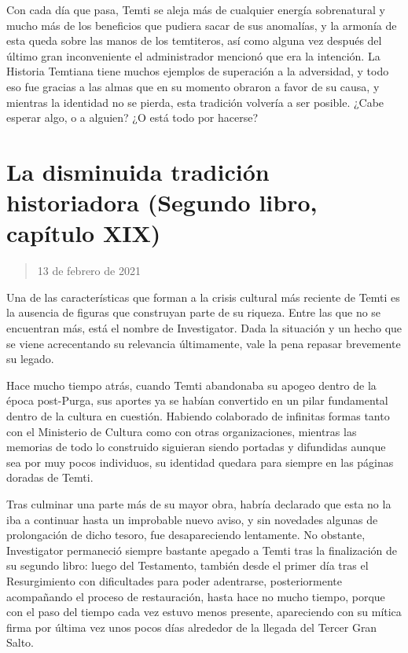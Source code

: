\documentclass[
  spanish,
]{book}
\begin{document}
Con cada día que pasa, Temti se aleja más de cualquier energía sobrenatural y mucho más de los beneficios que pudiera sacar de sus anomalías, y la armonía de esta queda sobre las manos de los temtiteros, así como alguna vez después del último gran inconveniente el administrador mencionó que era la intención. La Historia Temtiana tiene muchos ejemplos de superación a la adversidad, y todo eso fue gracias a las almas que en su momento obraron a favor de su causa, y mientras la identidad no se pierda, esta tradición volvería a ser posible. ¿Cabe esperar algo, o a alguien? ¿O está todo por hacerse?

\hypertarget{la-disminuida-tradiciuxf3n-historiadora-segundo-libro-capuxedtulo-xix}{%
\section{La disminuida tradición historiadora (Segundo libro, capítulo XIX)}\label{la-disminuida-tradiciuxf3n-historiadora-segundo-libro-capuxedtulo-xix}}

\begin{quote}
13 de febrero de 2021
\end{quote}

Una de las características que forman a la crisis cultural más reciente de Temti es la ausencia de figuras que construyan parte de su riqueza. Entre las que no se encuentran más, está el nombre de Investigator. Dada la situación y un hecho que se viene acrecentando su relevancia últimamente, vale la pena repasar brevemente su legado.

Hace mucho tiempo atrás, cuando Temti abandonaba su apogeo dentro de la época post-Purga, sus aportes ya se habían convertido en un pilar fundamental dentro de la cultura en cuestión. Habiendo colaborado de infinitas formas tanto con el Ministerio de Cultura como con otras organizaciones, mientras las memorias de todo lo construido siguieran siendo portadas y difundidas aunque sea por muy pocos individuos, su identidad quedara para siempre en las páginas doradas de Temti.

Tras culminar una parte más de su mayor obra, habría declarado que esta no la iba a continuar hasta un improbable nuevo aviso, y sin novedades algunas de prolongación de dicho tesoro, fue desapareciendo lentamente. No obstante, Investigator permaneció siempre bastante apegado a Temti tras la finalización de su segundo libro: luego del Testamento, también desde el primer día tras el Resurgimiento con dificultades para poder adentrarse, posteriormente acompañando el proceso de restauración, hasta hace no mucho tiempo, porque con el paso del tiempo cada vez estuvo menos presente, apareciendo con su mítica firma por última vez unos pocos días alrededor de la llegada del Tercer Gran Salto.
\end{document}
